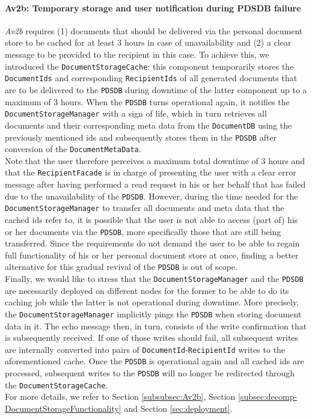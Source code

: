 \documentclass[a4paper,10pt]{article}
\begin{document}
\paragraph{Av2b\@: Temporary storage and user notification during PDSDB failure}
\textit{Av2b} requires (1) documents that should be delivered via the personal document store to be cached for at least 3 hours in case of unavailability and (2) a clear message to be provided to the recipient in this case. To achieve this, we introduced the \texttt{DocumentStorageCache}: this component temporarily stores the \texttt{DocumentIds} and corresponding \texttt{RecipientIds} of all generated documents that are to be delivered to the \texttt{PDSDB} during downtime of the latter component up to a maximum of 3 hours. When the \texttt{PDSDB} turns operational again, it notifies the \texttt{DocumentStorageManager} with a sign of life, which in turn retrieves all documents and their corresponding meta data from the \texttt{DocumentDB} using the previously mentioned ids and subsequently stores them in the \texttt{PDSDB} after conversion of the \texttt{DocumentMetaData}.\\
Note that the user therefore perceives a maximum total downtime of 3 hours and that the \texttt{RecipientFacade} is in charge of presenting the user with a clear error message after having performed a read request in his or her behalf that has failed due to the unavailability of the \texttt{PDSDB}. However, during the time needed for the \texttt{DocumentStorageManager} to transfer all documents and meta data that the cached ids refer to, it is possible that the user is not able to access (part of) his or her documents via the \texttt{PDSDB}, more specifically those that are still being transferred. Since the requirements do not demand the user to be able to regain full functionality of his or her personal document store at once, finding a better alternative for this gradual revival of the \texttt{PDSDB} is out of scope.\\
Finally, we would like to stress that the \texttt{DocumentStorageManager} and the \texttt{PDSDB} are necessarily deployed on different nodes for the former to be able to do its caching job while the latter is not operational during downtime. More precisely, the \texttt{DocumentStorageManager} implicitly pings the \texttt{PDSDB} when storing document data in it. The echo message then, in turn, consists of the write confirmation that is subsequently received. If one of those writes should fail, all subsequent writes are internally converted into pairs of \texttt{DocumentId}-\texttt{RecipientId} writes to the aforementioned cache. Once the \texttt{PDSDB} is operational again and all cached ids are processed, subsequent writes to the \texttt{PDSDB} will no longer be redirected through the \texttt{DocumentStorageCache}.\\
For more details, we refer to Section \ref{subsubsec:Av2b}, Section \ref{subsec:decomp-DocumentStorageFunctionality} and Section \ref{sec:deployment}.
\end{document}
